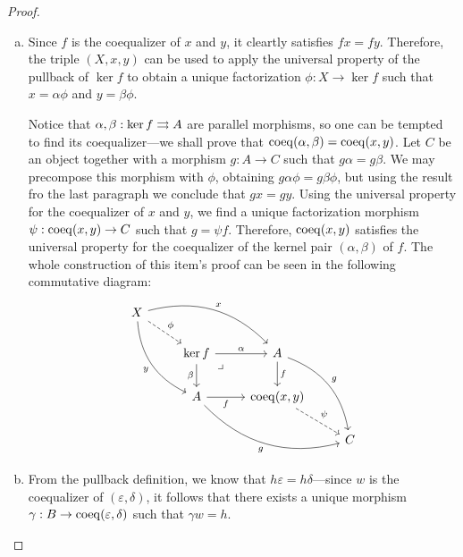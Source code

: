 \begin{proof}
    \begin{enumerate}[(a)]\setlength\itemsep{0em}
        \item Since \(f\) is the coequalizer of \(x\) and \(y\), it cleartly satisfies
              \(f x = f y\). Therefore, the triple \((X, x, y)\) can be used to apply the
              universal property of the pullback of \(\ker f\) to obtain a unique
              factorization \(\phi: X \to \ker f\) such that \(x = \alpha \phi\) and
              \(y = \beta \phi\).

              Notice that \(\alpha, \beta: \ker f \rightrightarrows A\) are parallel morphisms, so one
              can be tempted to find its coequalizer---we shall prove that
              \(\operatorname{coeq}(\alpha, \beta) = \operatorname{coeq}(x, y)\). Let \(C\) be an object together with a
              morphism \(g: A \to C\) such that \(g \alpha = g \beta\). We may precompose
              this morphism with \(\phi\), obtaining \(g \alpha \phi = g \beta \phi\), but
              using the result fro the last paragraph we conclude that \(g x = g y\). Using
              the universal property for the coequalizer of \(x\) and \(y\), we find a
              unique factorization morphism \(\psi: \operatorname{coeq}(x, y) \to C\) such that
              \(g = \psi f\). Therefore, \(\operatorname{coeq}(x, y)\) satisfies the universal property
              for the coequalizer of the kernel pair \((\alpha, \beta)\) of \(f\). The whole
              construction of this item's proof can be seen in the following commutative
              diagram:
              \[
                  \begin{tikzcd}
                      X \ar[rd, dashed, "\phi"]
                      \ar[rrd, bend left, "x"]
                      \ar[drd, bend right, "y"'] & & &
                      \\
                      &\ker f \ar[r, "\alpha"]
                      \ar[rd, phantom, "\lrcorner", very near start]
                      \ar[d, "\beta"']
                      &A \ar[d, "f"] \ar[drd, bend left, "g"]
                      &
                      \\
                      &A \ar[r, "f"'] \ar[rrd, "g"', bend right]
                      &\Coeq(x, y) \ar[rd, dashed, "\psi"]
                      &
                      \\
                      & & &C
                  \end{tikzcd}
              \]

        \item From the pullback definition, we know that
              \(h \varepsilon = h \delta\)---since \(w\) is the coequalizer of
              \((\varepsilon, \delta)\), it follows that there exists a unique morphism
              \(\gamma: B \to \operatorname{coeq}(\varepsilon, \delta)\) such that \(\gamma w = h\).


\end{enumerate}
\end{proof}
